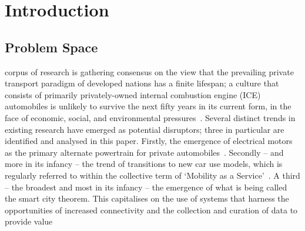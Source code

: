 \documentclass[journal]{IEEEtran}
\begin{document}
%
\IEEEpeerreviewmaketitle


\section{Introduction}\label{intro}
% 
% 
% 
% 

\subsection{Problem Space}

 corpus of research is gathering consensus on
the view that the prevailing private transport paradigm of developed
nations has a finite lifespan; a culture that consists of primarily
privately-owned internal combustion engine (ICE) automobiles is
unlikely to survive the next fifty years in its current form, in the
face of economic, social, and environmental
pressures~\cite{lerner:2011,van-audenhove-et-al:2014,black-et-al:2016}.
Several distinct trends in existing research have emerged as potential
disruptors; three in particular are identified and analysed in this
paper. Firstly, the emergence of electrical motors as the primary
alternate powertrain for private
automobiles~\cite{paffumi-et-al:2015,gnann-et-al:2015}.  Secondly --
and more in its infancy -- the trend of transitions to new car use
models, which is regularly referred to within the collective term of
`Mobility as a Service'~\cite{tscatapult:2016}. A third -- the
broadest and most in its infancy -- the emergence of what is being
called the smart city theorem. This capitalises on the use of systems
that harness the opportunities of increased connectivity and the
collection and curation of data to provide
value~\cite{townsend:2013,cosgrave-et-al:2013,ibm:2014}
\end{document}
